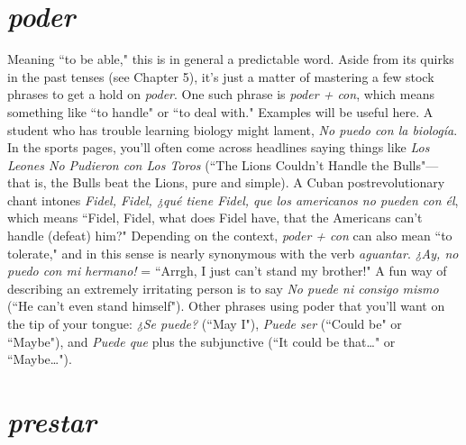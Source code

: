 \section{\emph{poder}}

Meaning ``to be able," this is in general a predictable word.
Aside from its quirks in the past tenses (see Chapter 5), it's just a matter of mastering a few stock phrases to get a hold on \emph{poder}. One such
phrase is \emph{poder + con}, which means something like ``to handle" or ``to
deal with." Examples will be useful here. A student who has trouble
learning biology might lament, \emph{No puedo con la biología}. In the sports
pages, you'll often come across headlines saying things like \emph{Los Leones
No Pudieron con Los Toros} (``The Lions Couldn't Handle the Bulls"---
that is, the Bulls beat the Lions, pure and simple). A Cuban postrevolutionary chant intones \emph{Fidel, Fidel, ¿qué tiene Fidel, que los americanos no pueden con él}, which means ``Fidel, Fidel, what does Fidel
have, that the Americans can't handle (defeat) him?" Depending on the
context, \emph{poder + con} can also mean ``to tolerate," and in this sense is
nearly synonymous with the verb \emph{aguantar}. \emph{¿Ay, no puedo con mi hermano!} = ``Arrgh, I just can't stand my brother!" A fun way of describing an extremely irritating person is to say \emph{No puede ni consigo mismo}
(``He can't even stand himself"). Other phrases using poder that you'll
want on the tip of your tongue: \emph{¿Se puede?} (``May I"), \emph{Puede ser}
(``Could be" or ``Maybe"), and \emph{Puede que} plus the subjunctive (``It
could be that\ldots{}" or ``Maybe\ldots{}").

\section{\emph{prestar}}

